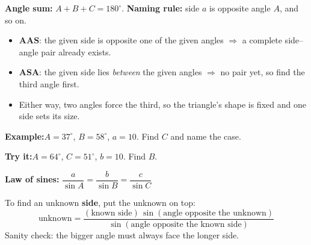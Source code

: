 \documentclass[12pt]{article}
\begin{document}


\begin{formulabox}
\textbf{Angle sum:} $A + B + C = 180^\circ$. \quad
\textbf{Naming rule:} side $a$ is opposite angle $A$, and so on.
\begin{itemize}[leftmargin=0.8cm, itemsep=0pt, topsep=2pt]
  \item \textbf{AAS}: the given side is opposite one of the given angles $\Rightarrow$ a complete side--angle pair already exists.
  \item \textbf{ASA}: the given side lies \emph{between} the given angles $\Rightarrow$ no pair yet, so find the third angle first.
  \item Either way, two angles force the third, so the triangle's shape is fixed and one side sets its size.
\end{itemize}
\end{formulabox}

\begin{examplebox}
\textbf{Example:}\quad $A = 37^\circ$, $B = 58^\circ$, $a = 10$. Find $C$ and name the case.
\end{examplebox}

\begin{tryitbox}
\textbf{Try it:}\quad $A = 64^\circ$, $C = 51^\circ$, $b = 10$. Find $B$.\\[2pt]
\end{tryitbox}


\begin{formulabox}
\textbf{Law of sines:}\quad
$\dfrac{a}{\sin A} = \dfrac{b}{\sin B} = \dfrac{c}{\sin C}$\par
To find an unknown \textbf{side}, put the unknown on top:
\[ \text{unknown} = \frac{(\text{known side})\, \sin(\text{angle opposite the unknown})}
                        {\sin(\text{angle opposite the known side})} \]
Sanity check: the bigger angle must always face the longer side.
\end{formulabox}
\end{document}
